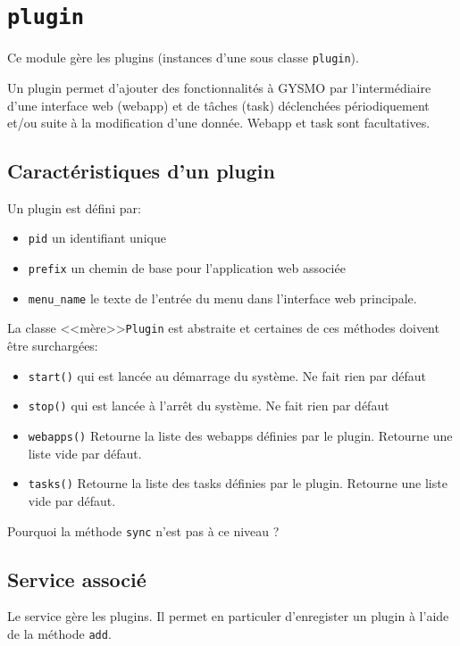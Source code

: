 \section{\lstinline|plugin|}

Ce module gère les plugins (instances d'une sous classe \lstinline|plugin|).

Un plugin permet d'ajouter des fonctionnalités à GYSMO par l'intermédiaire d'une interface web (webapp) et de tâches (task) déclenchées périodiquement et/ou suite à la modification d'une donnée. Webapp et task sont facultatives.


\subsection{Caractéristiques d'un plugin}

Un plugin est défini par:
\begin{itemize}
	\item \lstinline|pid| un identifiant unique
	\item \lstinline|prefix| un chemin de base pour l'application web associée
	\item \lstinline|menu_name| le texte de l'entrée du menu dans l'interface web principale.
\end{itemize}

La classe <<mère>>\lstinline|Plugin| est abstraite et certaines de ces méthodes doivent être surchargées:
\begin{itemize}
	\item\lstinline|start()| qui est lancée au démarrage du système. Ne fait rien par défaut
	\item\lstinline|stop()| qui est lancée à l'arrêt du système. Ne fait rien par défaut
	\item\lstinline|webapps()| Retourne la liste des webapps définies par le plugin. Retourne une liste vide par défaut.
	\item\lstinline|tasks()| Retourne la liste des tasks définies par le plugin. Retourne une liste vide par défaut.
\end{itemize}

{\color{red}Pourquoi la méthode \lstinline|sync| n'est pas à ce niveau ?}


\subsection{Service associé}

Le service gère les plugins. Il permet en particuler d'enregister un plugin à l'aide de la méthode \lstinline|add|.

